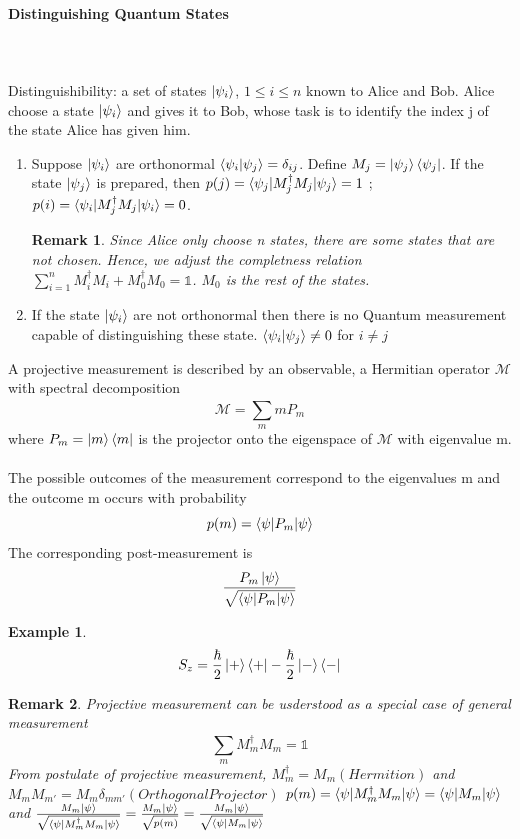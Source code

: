 \documentclass[]{article}
\newtheorem*{remark}{Remark}
\newtheorem*{example}{Example}
\theoremstyle{nonumberplain}
\begin{document}
\paragraph{Distinguishing Quantum States}%
\ \\
\\
Distinguishibility: a set of states $\ket{\psi_{i}}$, $1 \leq i \leq n$ known to Alice and Bob. Alice choose a state $\ket{\psi_{i}}$ and gives it to Bob, whose task is to identify the index j of the state Alice has given him.
\begin{enumerate}
	\item Suppose $\ket{\psi_{i}}$ are orthonormal $\braket{\psi_{i}|\psi_{j}}=\delta_{ij}$. Define $M_{j}=\ket{\psi_{j}}\bra{\psi_{j}}$. If the state $\ket{\psi_{j}}$ is prepared, then $p(j)=\braket{\psi_{j}|M_{j}^{\dagger}M_{j}|\psi_{j}}=1$ ; $p(i)=\braket{\psi_{i}|M_{j}^{\dagger}M_{j}|\psi_{i}}=0$. 
\begin{remark}
	Since Alice only choose n states, there are some states that are not chosen. Hence, we adjust the completness relation $ \sum^{n}_{i=1} M_{i}^{\dagger}M_{i} + M_{0}^{\dagger}M_{0}=\mathbb{1}$. $M_{0}$ is the rest of the states.
\end{remark}
	\item If the state $\ket{\psi_{i}}$ are not orthonormal then there is no Quantum measurement capable of distinguishing these state. $\braket{\psi_{i}|\psi_{j}}\neq 0$ for $i\neq j$
\end{enumerate}
\begin{postu}
A projective measurement is described by an observable, a Hermitian operator $\mathcal{M}$ with spectral decomposition
\[
\mathcal{M}= \sum^{}_{m} m P_{m}
\] 
where $P_{m}=\ket{m}\bra{m}$ is the projector onto the eigenspace of $\mathcal{M}$ with eigenvalue m. \\ \\
The possible outcomes of the measurement correspond to the eigenvalues m and the outcome m occurs with probability
\[
	p(m)=\braket{\psi|P_{m}|\psi}
\] 
The corresponding post-measurement is 
\[
	\frac{P_{m}\ket{\psi}}{\sqrt{\braket{\psi|P_{m}|\psi}}}
\] 
\end{postu}
\begin{example}
\[
S_{z}=
\frac{\hbar}{2}\ket{+}\bra{+} - \frac{\hbar}{2}\ket{-}\bra{-} 
\] 
\end{example}
\begin{remark}
Projective measurement can be usderstood as a special case of general  measurement
\[
	\sum^{}_{m} M^{\dagger}_{m}M_{m}=\mathbb{1}
\] 
From postulate of projective measurement, $M_{m}^{\dagger}=M_{m} (Hermition)$ and $M_{m}M_{m'}=M_{m}\delta_{mm'} (Orthogonal Projector)$  $p(m) = \braket{\psi|M^{\dagger}_{m}M_{m}|\psi}=\braket{\psi|M_{m}|\psi}$ and $\frac{M_{m}\ket{\psi}}{\sqrt{\braket{\psi|M^{\dagger}_{m}M_{m}|\psi}}}=\frac{M_{m}\ket{\psi}}{\sqrt{p(m)}}=\frac{M_{m}\ket{\psi}}{\sqrt{\braket{\psi|M_{m}|\psi}}}$
\end{remark}
\end{document}
